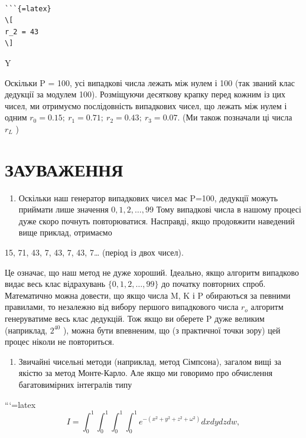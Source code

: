 \documentclass[
]{article}
\providecommand{\tightlist}{%
  \setlength{\itemsep}{0pt}\setlength{\parskip}{0pt}}
\begin{document}
\begin{verbatim}

```{=latex}
\[
r_2 = 43
\]
\end{verbatim}

Y

Оскільки P = 100, усі випадкові числа лежать між нулем і 100 (так званий
клас дедукції за модулем 100). Розміщуючи десяткову крапку перед кожним
із цих чисел, ми отримуємо послідовність випадкових чисел, що лежать між
нулем і одним \(r_0=0.15;\ r_1=0.71;\ r_2=0.43;\ r_3=0.07.\) (Ми також
позначали ці числа \(r_L\) )

\section{ЗАУВАЖЕННЯ}\label{ux437ux430ux443ux432ux430ux436ux435ux43dux43dux44f-1}

\begin{enumerate}
\def\labelenumi{\arabic{enumi}.}
\tightlist
\item
  Оскільки наш генератор випадкових чисел має P=100, дедукції можуть
  приймати лише значення \(0,1,2,\ldots,99\) Тому випадкові числа в
  нашому процесі дуже скоро почнуть повторюватися. Насправді, якщо
  продовжити наведений вище приклад, отримаємо
\end{enumerate}

15, 71, 43, 7, 43, 7, 43, 7\ldots{} (період із двох чисел).

Це означає, що наш метод не дуже хороший. Ідеально, якщо алгоритм
випадково видає весь клас відрахувань \(\{0, 1, 2, \ldots, 99\}\) до
початку повторних спроб. Математично можна довести, що якщо числа M, K і
P обираються за певними правилами, то незалежно від вибору першого
випадкового числа \(r_o\) алгоритм генеруватиме весь клас дедукцій. Тож
якщо ви оберете P дуже великим (наприклад, \(2^{40}\) ), можна бути
впевненим, що (з практичної точки зору) цей процес ніколи не
повториться.

\begin{enumerate}
\def\labelenumi{\arabic{enumi}.}
\setcounter{enumi}{1}
\tightlist
\item
  Звичайні чисельні методи (наприклад, метод Сімпсона), загалом вищі за
  якістю за метод Монте-Карло. Але якщо ми говоримо про обчислення
  багатовимірних інтегралів типу
\end{enumerate}

```{=latex}
\[
I = \int_{0}^{1} \int_{0}^{1} \int_{0}^{1} \int_{0}^{1} e^{-(x^{2}+y^{2}+z^{2}+\omega^{2})} dx dy dz dw,
\]
\end{document}
